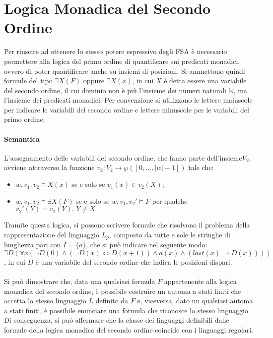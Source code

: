 \section{Logica Monadica del Secondo Ordine}
Per riuscire ad ottenere lo stesso potere espressivo degli FSA è necessario permettere alla logica del primo ordine di quantificare sui predicati monadici, ovvero di poter quantificare anche su insiemi di posizioni. Si ammettono quindi formule del tipo \(\exists X(F)\) oppure \(\exists X(x)\), in cui \(X\) è detta essere una variabile del secondo ordine, il cui dominio non è più l'insieme dei numeri naturali \(\mathbb N\), ma l'insieme dei predicati monadici. Per convenzione si utilizzano le lettere maiuscole per indicare le variabili del secondo ordine e lettere minuscole per le variabili del primo ordine.

\paragraph*{Semantica}
L'assegnamento delle variabili del secondo ordine, che fanno parte dell'insieme\(V_2\), avviene attraverso la funzione \(v_2: V_2 \to \wp ([0,...,|w|-1])\) tale che:
\begin{itemize}
  \item \(w,v_1,v_2 \vDash X(x)\) se e solo se \(v_1(x) \in v_2(X)\);
  \item \(w,v_1,v_2 \vDash \exists X(F)\) se e solo se \(w,v_1, v_2'\vDash F\) per qualche \(v_2'(Y) = v_2(Y),\, Y\neq X\)
\end{itemize}

Tramite questa logica, si possono scrivere formule che risolvono il problema della rappresentazione del linguaggio \(L_p\), composto da tutte e sole le stringhe di lunghezza pari con \(I=\{a\}\), che si può indicare nel seguente modo: \(\exists D(\forall x(\lnot D(0) \wedge (\lnot D(x) \Leftrightarrow D(x+1)) \wedge a(x) \wedge (last(x) \Rightarrow D(x))))\), in cui \(D\) è una variabile del secondo ordine che indica le posizioni dispari.

\paragraph{}
Si può dimostrare che, data una qualsiasi formula \(F\) appartenente alla logica monadica del secondo ordine, è possibile costruire un automa a stati finiti che accetta lo stesso linguaggio \(L\) definito da \(F\) e, viceversa, dato un qualsiasi automa a stati finiti, è possibile enunciare una formula che riconosce lo stesso linguaggio. Di conseguenza, si può affermare che la classe dei linguaggi definibili dalle formule della logica monadica del secondo ordine coincide con i linguaggi regolari. 

